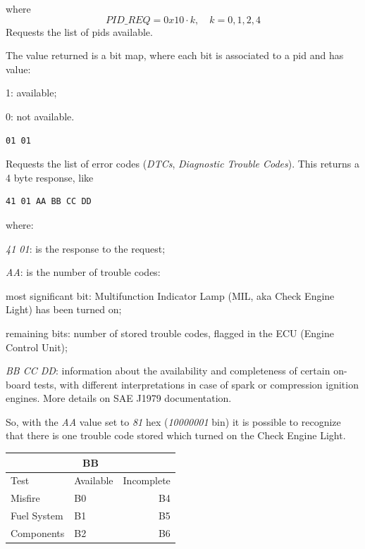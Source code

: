 \documentclass[twoside]{article}
\begin{document}
\begin{multicols}{2}
where
\begin{equation}
PID\_REQ = 0x10 \cdot k , \quad k = 0,1,2,4
\end{equation}
Requests the list of pids available.

The value returned is a bit map, where each bit is associated to a pid and has value:
\begin{compactitem}
  \item 1: available;
  \item 0: not available.
\end{compactitem}


\begin{lstlisting}[language=bash]
01 01
\end{lstlisting}
Requests the list of error codes (\emph{DTCs}, \emph{Diagnostic Trouble Codes}).
This returns a 4 byte response, like
\begin{lstlisting}[language=bash]
41 01 AA BB CC DD
\end{lstlisting}
where:
\begin{compactitem}
  \item \emph{41 01}: is the response to the request;
  \item \emph{AA}: is the number of trouble codes:
  \begin{compactitem}
    \item most significant bit: Multifunction Indicator Lamp (MIL, aka Check Engine Light) has been turned on;
    \item remaining bits: number of stored trouble codes, flagged in the ECU (Engine Control Unit);
  \end{compactitem}
  \item \emph{BB CC DD}: information about the availability and completeness of certain on-board tests, with different interpretations in case of spark or compression ignition engines. More details on SAE J1979 documentation.
\end{compactitem}

So, with the \emph{AA} value set to \emph{81} hex (\emph{10000001} bin) it is possible to recognize that there is one trouble code stored which turned on the Check Engine Light.

\begin{table}[H]
\centering
\begin{tabular}{llr}
\multicolumn{3}{c}{BB} \\
\toprule
Test & Available & Incomplete \\
\midrule
Misfire & B0 & B4 \\          
Fuel System & B1 & B5 \\
Components & B2 & B6 \\
\bottomrule
\end{tabular}
\end{table}


\end{multicols}
\end{document}
